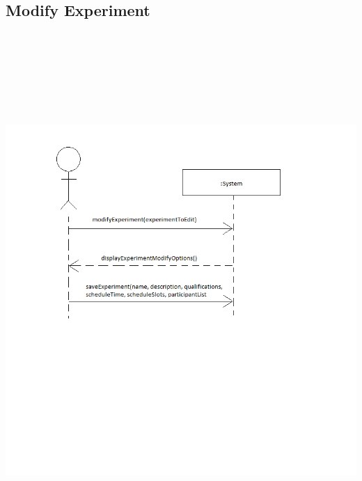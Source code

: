 \subsection{Modify Experiment}
\includegraphics[height=8in]{../other/System-Sequence-diagrams/modify-experiment.png}